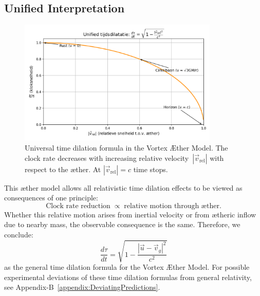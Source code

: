 \subsection*{Unified Interpretation}

\begin{figure}[htbp]
    \centering
    \includegraphics[width=0.85\textwidth]{11-TijdsvertragingRelatieveBeweging}
    \caption{Universal time dilation formula in the Vortex Æther Model. The clock rate decreases with increasing relative velocity~$|\vec{v}_{\mathrm{rel}}|$ with respect to the æther. At $|\vec{v}_{\mathrm{rel}}| = c$ time stops.}
    \label{fig:TijdsvertragingRelatieveBeweging}
\end{figure}

This æther model allows all relativistic time dilation effects to be viewed as consequences of one principle:
\[
\text{Clock rate reduction} \;\propto\; \text{relative motion through æther}.
\]
Whether this relative motion arises from inertial velocity or from ætheric inflow due to nearby mass, the observable consequence is the same. Therefore, we conclude:
\[
\boxed{\frac{d\tau}{dt} = \sqrt{1 - \frac{|\vec{u} - \vec{v}_g|^2}{c^2}}}
\]
as the general time dilation formula for the Vortex Æther Model.
For possible experimental deviations of these time dilation formulas from general relativity, see Appendix-B~\ref{appendix:DeviatingPredictions}.